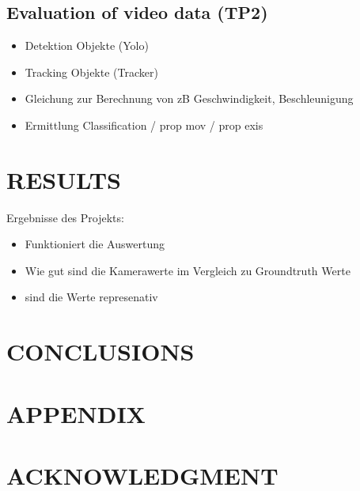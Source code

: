 \documentclass[letterpaper, 10 pt, conference]{ieeeconf}  %
\begin{document}
\subsection{Evaluation of video data (TP2)}

\begin{itemize}
\item Detektion Objekte (Yolo)
\item Tracking Objekte (Tracker)
\item Gleichung zur Berechnung von zB Geschwindigkeit, Beschleunigung
\item Ermittlung Classification / prop mov / prop exis

\end{itemize}








\section{RESULTS}

Ergebnisse des Projekts:
 
 \begin{itemize}
\item Funktioniert die Auswertung
\item Wie gut sind die Kamerawerte im Vergleich zu Groundtruth Werte
\item sind die Werte represenativ
\end{itemize}

   
\section{CONCLUSIONS}



\addtolength{\textheight}{-12cm}   %


\section*{APPENDIX}



\section*{ACKNOWLEDGMENT}



{
}
\end{document}
